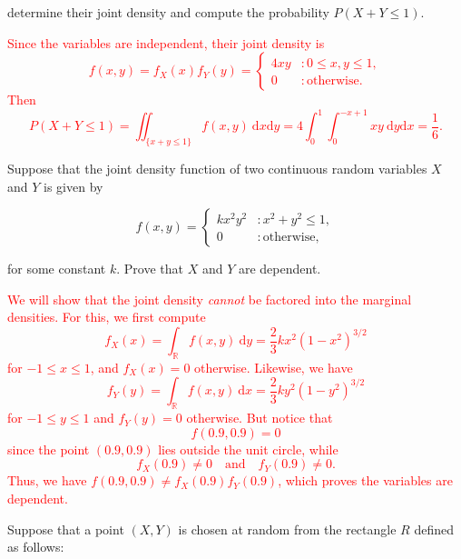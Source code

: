 \documentclass[12pt,reqno]{amsart}
\begin{document}
determine their joint density and compute the probability $P(X + Y \leq 1)$.

\bigskip
\textcolor{red}{Since the variables are independent, their joint density is
	\[f(x,y) = f_X(x) f_Y(y) =  \begin{cases}
	4xy & : 0 \leq x,y \leq 1, \\
	0 & : \text{otherwise}.
	\end{cases}
	\]
Then
	\[P(X+Y \leq 1) = \iint_{\{x+y\leq 1\}} f(x,y) \ \text{d}x\text{d}y = 4\int_0^1 \int_{0}^{-x+1} xy \ \text{d}y\text{d}x = \frac{1}{6}.
	\]}
	
	
	
	
	
	















\bigskip
\prob Suppose that the joint density function of two continuous random variables $X$ and $Y$ is given by

	\[f(x,y) = \begin{cases}
	k x^2y^2 & : x^2+y^2 \leq 1, \\
	0 & : \text{otherwise},
	\end{cases}
	\]
	
for some constant $k$. Prove that $X$ and $Y$ are dependent.

\bigskip
\textcolor{red}{We will show that the joint density \textit{cannot} be factored into the marginal densities. For this, we first compute
	\[f_X(x) = \int_{\mathbb{R}} f(x,y) \ \text{d}y = \frac{2}{3} k x^2 \left(1-x^2\right)^{3/2}
	\]
for $-1\leq x \leq 1$, and $f_X(x) = 0$ otherwise. Likewise, we have
	\[f_Y(y) = \int_{\mathbb{R}} f(x,y) \ \text{d} x = \frac{2}{3} k y^2 \left(1-y^2\right)^{3/2}
	\]
for $-1 \leq y \leq 1$ and $f_Y(y)=0$ otherwise. But notice that
	\[f(0.9, 0.9) = 0
	\]
since the point $(0.9,0.9)$ lies outside the unit circle, while
	\[f_X(0.9)\neq 0 \quad \text{and} \quad f_Y(0.9) \neq 0.
	\]
Thus, we have $f(0.9,0.9) \neq f_X(0.9) f_Y(0.9)$, which proves the variables are dependent.}












\bigskip
\prob Suppose that a point $(X, Y )$ is chosen at random from the rectangle $R$ defined as follows:
\end{document}
